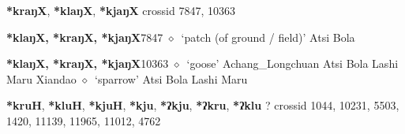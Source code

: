 \item
\textbf{*kraŋX}, \textbf{*klaŋX}, \textbf{*kjaŋX}
  {\tiny crossid 7847, 10363}
  \begin{list}{}{\leftmargin=1.5em \itemindent=-1.5em}
  \item {\footnotesize \textbf{*klaŋX, *kraŋX, *kjaŋX}}{\tiny 7847}
         $\diamond$~`patch (of ground / field)'
         Atsi 
\hspace{1ex}
         Bola 
  \item {\footnotesize \textbf{*klaŋX, *kraŋX, *kjaŋX}}{\tiny 10363}
\hspace{1ex}
         $\diamond$~`goose'
         Achang\_Longchuan 
\hspace{1ex}
         Atsi 
\hspace{1ex}
         Bola 
\hspace{1ex}
         Lashi 
\hspace{1ex}
         Maru 
\hspace{1ex}
         Xiandao 
\hspace{1ex}
         $\diamond$~`sparrow'
         Atsi 
\hspace{1ex}
         Bola 
\hspace{1ex}
         Lashi 
\hspace{1ex}
         Maru 
  \end{list}
\item
\textbf{*kruH}, \textbf{*kluH}, \textbf{*kjuH}, \textbf{*kju}, \textbf{*ʔkju}, \textbf{*ʔkru}, \textbf{*ʔklu}
?
  {\tiny crossid 1044, 10231, 5503, 1420, 11139, 11965, 11012, 4762}
